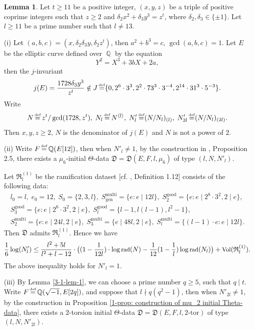 \documentclass[a4paper, 12pt]{article}
\DeclareMathOperator{\defeq}{\overset{\text{\tiny{def}}}{=}}
\DeclareMathOperator{\Q}{\mathbb{Q}}
\DeclareMathOperator{\rad}{\text{rad}}
\DeclareMathOperator{\good}{\text{good}}
\DeclareMathOperator{\multi}{\text{multi}}
\DeclareMathOperator{\gen}{\text{gen}}
\DeclareMathOperator{\Vol}{\text{Vol}}
\newcommand{\lagl}{\langle l \rangle}
\numberwithin{equation}{section}
\theoremstyle{definition}
\newtheorem{lem}[thm]{Lemma}
\begin{document}
\begin{lem}  \label{3-1-lem-2}
Let $t\ge 11$ be a positive integer, $(x,y,z)$ be a triple of positive coprime integers such that $z\ge 2$ and $\delta_2 x^2 + \delta_3 y^3 = z^t$, where $\delta_2,\delta_3 \in \{\pm 1\}$. Let $l\ge 11$ be a prime number such that $l\neq 13$.

(i) Let $(a,b,c) = (x, \delta_2\delta_3 y, \delta_2 z^t)$, then $a^2+b^3 = c$, $\gcd(a,b,c) = 1$.
Let $E$ be the elliptic curve defined over $\Q$ by the equation 
$$Y^2 = X^3 + 3bX + 2a,$$
then the $j$-invariant
$$j(E) = \frac{ 1728\delta_3 y^3 }{ z^t } \notin J \defeq \{0,2^6\cdot 3^3,2^2\cdot 73^3\cdot 3^{-4},2^{14}\cdot 31^3\cdot 5^{-3}\} .$$
Write 
$$N \defeq z^t / \gcd(1728, z^t), \; N_l \defeq N^{\lagl}, \; N'_l \defeq (N/N_l)_{(l)}, \;  N'_{2l} \defeq (N/N_l)_{(2l)}. $$
Then $x,y,z \ge 2$, $N$ is the denominator of $j(E)$ and $N$ is not a power of $2$.

(ii) Write $F\defeq \Q(E[12])$,
then when $N'_l \neq 1$, by the construction in \cite{Diophantine_after_IUT_I}, Proposition 2.5, there exists a $\mu_6$-initial $\Theta$-data $\mathfrak D = \mathfrak D(E,F,l,\mu_6)$ of type $(l, N, N'_l)$.

Let $\mathfrak{R}_l^{(1)}$ be the ramification dataset [cf. \cite{Diophantine_after_IUT_I}, Definition 1.12] consists of the following data:
\begin{gather*}
l_0 = l, \;  e_0 = 12, \; S_0=\{2,3,l\}, \; S_{\gen}^{\multi} = \{e: e\mid 12 l \},  \;
S_2^{\good} = \{e: e\mid 2^8\cdot 3^2, 2\mid e\}, \\ 
S_3^{\good} = \{e: e\mid 2^6\cdot 3^2, 2\mid e\}, \;
S_l^{\good} = \{l-1, l(l-1), l^2-1\}, \\
S_2^{\multi} = \{e: e\mid 24l, 2\mid e\}, \; S_3^{\multi} = \{e\mid 48l, 2\mid e\}, \;
S_l^{\multi} = \{(l-1)\cdot e: e\mid 12l\} .
\end{gather*}
Then $\mathfrak D$ admits $\mathfrak R_l^{(1)}$.
Hence we have 
\begin{equation} \small \label{3-1-eq1}
    \frac{1}{6}\log(N'_l) \le  \frac{l^2+5l}{l^2+l-12}\cdot \big( (1-\frac{1}{12  l})\cdot \log\rad(N) - \frac{1}{12}(1- \frac{1}{l}) \log\rad(N_l)  \big) + \Vol(\mathfrak R_l^{(1)}).
\end{equation}
The above inequality holds for $N'_l = 1$.

(iii) By Lemma \ref{3-1-lem-1}, we can choose a prime number $q\ge 5$, such that $q\mid t$. 
Write $F\defeq \Q(\sqrt{-1}, E[2q])$, and suppose that $l\nmid q(q^2-1)$, 
then when $N'_{2l} \neq 1$, by the construction in Proposition \ref{1-prop: construction of mu_2 initial Theta-data}, there exists a $2$-torsion initial $\Theta$-data $\mathfrak D = \mathfrak D(E,F,l,2\text{-tor})$ of type $(l, N, N'_{2l})$.


\end{lem}
\end{document}
